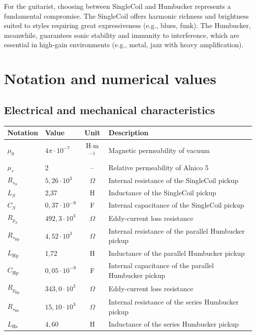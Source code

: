\documentclass[11pt, a4paper]{article}
\begin{document}
For the guitarist, choosing between SingleCoil and Humbucker represents a fundamental compromise. The SingleCoil offers harmonic richness and brightness suited to styles requiring great expressiveness (e.g., blues, funk). The Humbucker, meanwhile, guarantees sonic stability and immunity to interference, which are essential in high-gain environments (e.g., metal, jazz with heavy amplification).

\newpage
\section{Notation and numerical values}
\subsection{Electrical and mechanical characteristics}
\begin{center}
\small
\begin{tabularx}{\textwidth}{llcX}
\toprule
\textbf{Notation} & \textbf{Value} & \textbf{Unit} & \textbf{Description} \\
\midrule
$\mu_{0}$ & $4\pi \cdot 10^{-7}$ & H$\cdot$m$^{-1}$ & Magnetic permeability of vacuum \\
$\mu_{r}$ & 2 & -- & Relative permeability of Alnico 5 \\
\midrule
$R_{s_S}$ & $5,26 \cdot 10^3$ & $\Omega$ & Internal resistance of the SingleCoil pickup \\
$L_{S}$ & 2,37 & H & Inductance of the SingleCoil pickup \\
$C_{S}$ & $0,37 \cdot 10^{-9}$ & F & Internal capacitance of the SingleCoil pickup \\
$R_{p_S}$ & $492,3 \cdot 10^3$ & $\Omega$ & Eddy-current loss resistance \\
\midrule
$R_{s_{\text{Hp}}}$ & $4,52 \cdot 10^3$ & $\Omega$ & Internal resistance of the parallel Humbucker pickup \\
$L_{\text{Hp}}$ & 1,72 & H & Inductance of the parallel Humbucker pickup \\
$C_{\text{Hp}}$ & $0,05 \cdot 10^{-9}$ & F & Internal capacitance of the parallel Humbucker pickup \\
$R_{p_{\text{Hp}}}$ & $343,0 \cdot 10^3$ & $\Omega$ & Eddy-current loss resistance \\
\midrule
$R_{s_{\text{Hs}}}$ & $15,10 \cdot 10^3$ & $\Omega$ & Internal resistance of the series Humbucker pickup \\
$L_{\text{Hs}}$ & $4,60$ & H & Inductance of the series Humbucker pickup \\

\end{tabularx}
\end{center}
\end{document}

